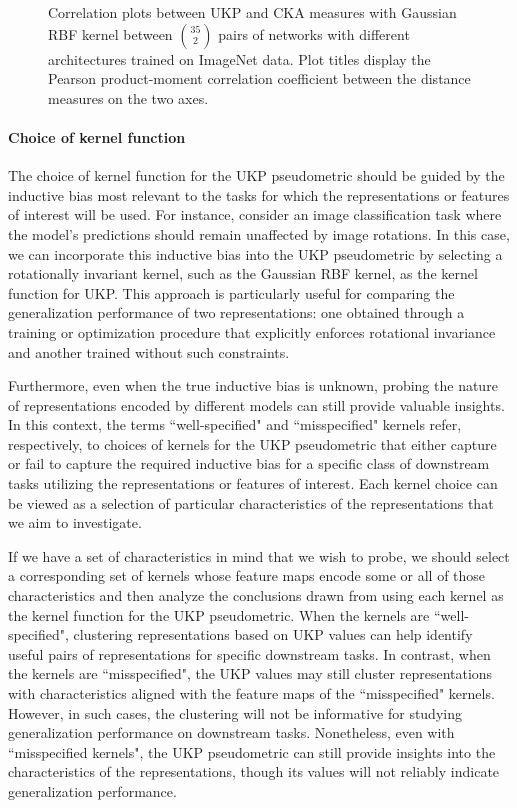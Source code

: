 \documentclass[11pt]{article}
\newcommand{\metricstname}{UKP }
\theoremstyle{plain}
\begin{document}
\begin{figure}[h!]
    \caption{Correlation plots between UKP and CKA measures with Gaussian RBF kernel between $\binom{35}{2}$ pairs of networks with different architectures trained on  ImageNet data. Plot titles display the Pearson product-moment correlation coefficient between the distance measures on the two axes.}
    \label{ImageNet correlation plots UKP CKA}
\end{figure}

\paragraph{Choice of kernel function} The choice of kernel function for the \metricstname pseudometric should be guided by the inductive bias most relevant to the tasks for which the representations or features of interest will be used. For instance, consider an image classification task where the model's predictions should remain unaffected by image rotations. In this case, we can incorporate this inductive bias into the \metricstname pseudometric by selecting a rotationally invariant kernel, such as the Gaussian RBF kernel, as the kernel function for UKP. This approach is particularly useful for comparing the generalization performance of two representations: one obtained through a training or optimization procedure that explicitly enforces rotational invariance and another trained without such constraints.

Furthermore, even when the true inductive bias is unknown, probing the nature of representations encoded by different models can still provide valuable insights. In this context, the terms ``well-specified" and ``misspecified" kernels refer, respectively, to choices of kernels for the UKP pseudometric that either capture or fail to capture the required inductive bias for a specific class of downstream tasks utilizing the representations or features of interest. Each kernel choice can be viewed as a selection of particular characteristics of the representations that we aim to investigate.

If we have a set of characteristics in mind that we wish to probe, we should select a corresponding set of kernels whose feature maps encode some or all of those characteristics and then analyze the conclusions drawn from using each kernel as the kernel function for the \metricstname pseudometric. When the kernels are ``well-specified", clustering representations based on \metricstname values can help identify useful pairs of representations for specific downstream tasks. In contrast, when the kernels are ``misspecified", the \metricstname values may still cluster representations with characteristics aligned with the feature maps of the ``misspecified" kernels. However, in such cases, the clustering will not be informative for studying generalization performance on downstream tasks. Nonetheless, even with ``misspecified kernels", the \metricstname pseudometric can still provide insights into the characteristics of the representations, though its values will not reliably indicate generalization performance.
\end{document}

